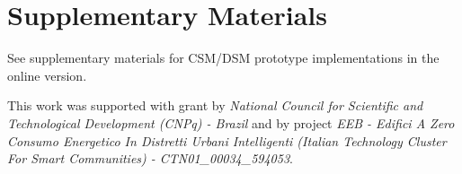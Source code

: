 \documentclass[format=acmsmall, review=true, screen=false]{acmart}
\begin{document}
	\section{Supplementary Materials}	
	
	\begin{printonly}
	  See supplementary materials for CSM/DSM prototype implementations in the online version.
	\end{printonly}
	
	\begin{screenonly}
	
	
	  
	\end{screenonly}
	
	\begin{acks}
	
	This work was supported with grant by \textit{National Council for Scientific and Technological Development (CNPq) - Brazil} and by project \textit{EEB - Edifici A Zero Consumo Energetico In Distretti Urbani Intelligenti (Italian Technology Cluster For Smart Communities) - CTN01\_00034\_594053}.
	
	\end{acks}
	
	
	
	
\end{document}
